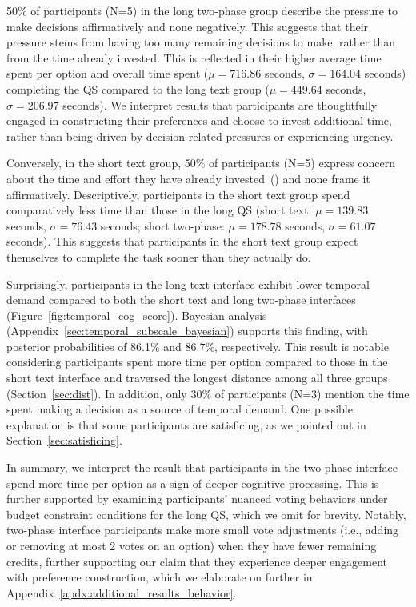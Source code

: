 50\% of participants (N=5) in the long two-phase group describe the pressure to make decisions affirmatively and none negatively. This suggests that their pressure stems from having too many remaining decisions to make, rather than from the time already invested. This is reflected in their higher average time spent per option and overall time spent ($\mu=716.86$ seconds, $\sigma=164.04$ seconds) completing the QS compared to the long text group ($\mu=449.64$ seconds, $\sigma=206.97$ seconds). We interpret results that participants are thoughtfully engaged in constructing their preferences and choose to invest additional time, rather than being driven by decision-related pressures or experiencing urgency.

Conversely, in the short text group, 50\% of participants (N=5) express concern about the time and effort they have already invested~() and none frame it affirmatively. Descriptively, participants in the short text group spend comparatively less time than those in the long QS (short text: $\mu=139.83$ seconds, $\sigma=76.43$ seconds; short two-phase: $\mu=178.78$ seconds, $\sigma=61.07$ seconds). This suggests that participants in the short text group expect themselves to complete the task sooner than they actually do. 

Surprisingly, participants in the long text interface exhibit lower temporal demand compared to both the short text and long two-phase interfaces (Figure~\ref{fig:temporal_cog_score}). Bayesian analysis (Appendix~\ref{sec:temporal_subscale_bayesian}) supports this finding, with posterior probabilities of 86.1\% and 86.7\%, respectively. This result is notable considering participants spent more time per option compared to those in the short text interface and traversed the longest distance among all three groups (Section~\ref{sec:dist}). In addition, only 30\% of participants (N=3) mention the time spent making a decision as a source of temporal demand. One possible explanation is that some participants are satisficing, as we pointed out in Section~\ref{sec:satisficing}.  

In summary, we interpret the result that participants in the two-phase interface spend more time per option as a sign of deeper cognitive processing. This is further supported by examining participants' nuanced voting behaviors under budget constraint conditions for the long QS, which we omit for brevity. Notably, two-phase interface participants make more small vote adjustments (i.e., adding or removing at most 2 votes on an option) when they have fewer remaining credits, further supporting our claim that they experience deeper engagement with preference construction, which we elaborate on further in Appendix~\ref{apdx:additional_results_behavior}.

